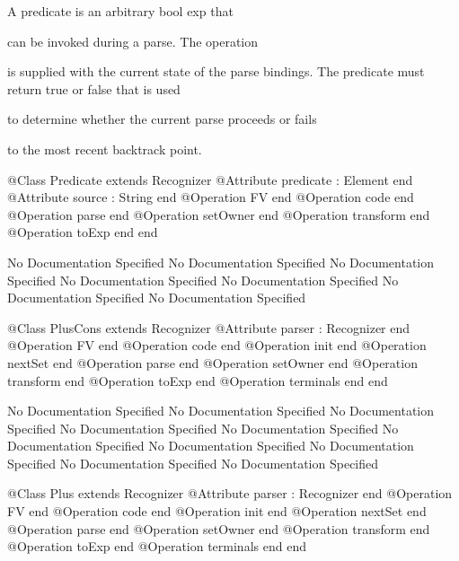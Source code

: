       A predicate is an arbitrary bool exp that

      can be invoked during a parse. The operation

      is supplied with the current state of the parse bindings.
      The predicate must return true or false that is used

      to determine whether the current parse proceeds or fails

      to the most recent backtrack point.
\begin{Interface}
@Class Predicate extends Recognizer
  @Attribute predicate : Element end
  @Attribute source : String end
  @Operation FV end
  @Operation code end
  @Operation parse end
  @Operation setOwner end
  @Operation transform end
  @Operation toExp end
end
\end{Interface}
No Documentation Specified
No Documentation Specified
No Documentation Specified
No Documentation Specified
No Documentation Specified
No Documentation Specified
No Documentation Specified
\begin{Interface}
@Class PlusCons extends Recognizer
  @Attribute parser : Recognizer end
  @Operation FV end
  @Operation code end
  @Operation init end
  @Operation nextSet end
  @Operation parse end
  @Operation setOwner end
  @Operation transform end
  @Operation toExp end
  @Operation terminals end
end
\end{Interface}
No Documentation Specified
No Documentation Specified
No Documentation Specified
No Documentation Specified
No Documentation Specified
No Documentation Specified
No Documentation Specified
No Documentation Specified
No Documentation Specified
No Documentation Specified
\begin{Interface}
@Class Plus extends Recognizer
  @Attribute parser : Recognizer end
  @Operation FV end
  @Operation code end
  @Operation init end
  @Operation nextSet end
  @Operation parse end
  @Operation setOwner end
  @Operation transform end
  @Operation toExp end
  @Operation terminals end
end
\end{Interface}
